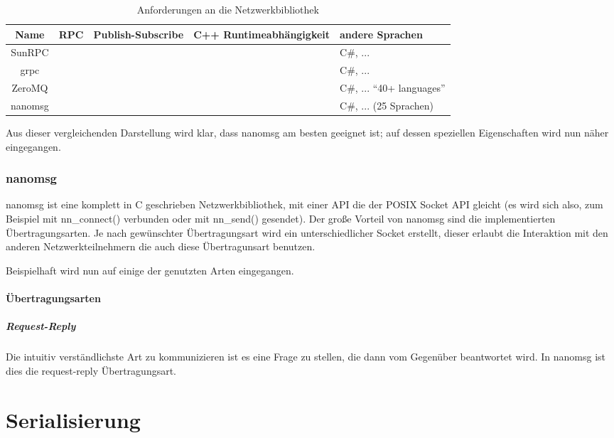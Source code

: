 \clearpage %
\begin{table}[h]
\centering
\begin{tabu}{c | c | c | c | p{5cm}}
	\toprule
	Name & RPC & Publish-Subscribe & C++ Runtimeabh{\"{a}}ngigkeit & andere Sprachen \\
	\midrule
	SunRPC & \checkmark & \xmark & \checkmark & C\#, ... \\
	grpc\cite{grpc} & \checkmark & \xmark & \xmark & C\#, ... \\
	ZeroMQ\cite{zeromq} & \xmark & \checkmark & \xmark & C\#, ... \enquote{40+ languages} \\
	nanomsg\cite{nanomsg} & \xmark & \checkmark & \checkmark & C\#, ... (25 Sprachen) \\
	\bottomrule
\end{tabu}
\caption{Anforderungen an die Netzwerkbibliothek}
\end{table}

Aus dieser vergleichenden Darstellung wird klar, dass nanomsg am besten geeignet ist; auf dessen speziellen Eigenschaften wird nun n{\"{a}}her eingegangen.

\subsubsection{nanomsg}
nanomsg ist eine komplett in C geschrieben Netzwerkbibliothek, mit einer API die der POSIX Socket API gleicht (es wird sich also, zum Beispiel mit nn\_connect() verbunden oder mit nn\_send() gesendet).
Der gro{\ss}e Vorteil von nanomsg sind die implementierten {\"{U}}bertragungsarten. Je nach gew{\"{u}}nschter {\"{U}}bertragungsart wird ein unterschiedlicher Socket erstellt, dieser erlaubt die
Interaktion mit den anderen Netzwerkteilnehmern die auch diese {\"{U}}bertragunsart benutzen.

Beispielhaft wird nun auf einige der genutzten Arten eingegangen.

\paragraph{{\"{U}}bertragungsarten}
\subparagraph{Request-Reply} Die intuitiv verst{\"{a}}ndlichste Art zu kommunizieren ist es eine Frage zu stellen, die dann vom Gegen{\"{u}}ber beantwortet wird. In nanomsg ist dies die request-reply
{\"{U}}bertragungsart.

\clearpage
\section{Serialisierung}

